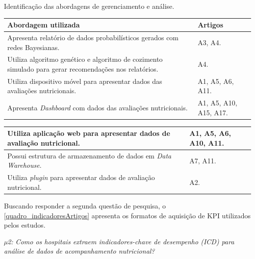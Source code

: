 \begin{quadro}[htb]
\caption{\label{quadro_funcionalidadesArtigos}Identificação das abordagens de gerenciamento e análise.}
\label{}
\begin{tabular}{|p{11cm}|p{4cm}|}
	\hline
	\textbf{Abordagem utilizada}   &   \textbf{Artigos}\\ \hline
	Apresenta relatório de dados probabilísticos gerados com redes Bayesianas.   &   A3, A4.\\ \hline
	Utiliza algoritmo genético e algoritmo de cozimento simulado para gerar recomendações nos relatórios.  &   A4.\\ \hline
	Utiliza dispositivo móvel para apresentar dados das avaliações nutricionais. & A1, A5, A6, A11.\\ \hline
	Apresenta \textit{Dashboard} com dados das avaliações nutricionais. & A1, A5, A10, A15, A17.\\ \hline
\end{tabular}
\end{quadro}

\begin{quadro}[htb]
\begin{tabular}{|p{11cm}|p{4cm}|}
    \hline
    Utiliza aplicação web para apresentar dados de avaliação nutricional. & A1, A5, A6, A10, A11.\\ \hline
	Possui estrutura de armazenamento de dados em\textit{ Data Warehouse}. & A7, A11.\\ \hline
	Utiliza \textit{plugin} para apresentar dados de avaliação nutricional.  & A2.\\ \hline
\end{tabular}
\end{quadro}

Buscando responder a segunda questão de pesquisa, o \autoref{quadro_indicadoresArtigos} apresenta os formatos de aquisição de KPI utilizados pelos estudos.

\textit{µ2: Como os hospitais extraem indicadores-chave de desempenho (ICD) para análise de dados de acompanhamento nutricional?}


